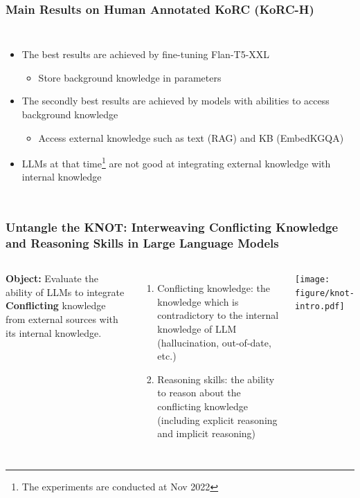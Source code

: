 \documentclass{beamer}
\begin{document}
\begin{frame}
\frametitle{Main Results on Human Annotated KoRC (KoRC-H)}

\begin{columns}
    \begin{itemize}
        \item The best results are achieved by fine-tuning Flan-T5-XXL
        \begin{itemize}
            \item Store background knowledge in parameters
        \end{itemize}
        \item The secondly best results are achieved by models with abilities to access background knowledge
        \begin{itemize}
            \item Access external knowledge such as text (RAG) and KB (EmbedKGQA)
        \end{itemize}
        \item LLMs at that time\footnote{The experiments are conducted at Nov 2022} are not good at integrating external knowledge with internal knowledge
    \end{itemize}
    
\end{columns}
\end{frame}



\begin{frame}
\frametitle{Untangle the KNOT: Interweaving Conflicting Knowledge and Reasoning Skills in Large Language Models}
\begin{columns}
    \textbf{Object:} Evaluate the ability of LLMs to integrate \textbf{Conflicting} knowledge from external sources with its internal knowledge.
    \begin{enumerate}
        \item Conflicting knowledge: the knowledge which is contradictory to the internal knowledge of LLM (hallucination, out-of-date, etc.)
        \item Reasoning skills: the ability to reason about the conflicting knowledge (including explicit reasoning and implicit reasoning)
    \end{enumerate}
    \vspace*{-1.7cm}
    \texttt{[image: figure/knot-intro.pdf]}
\end{columns}
\end{frame}


\backmatter
{}


\end{document}
